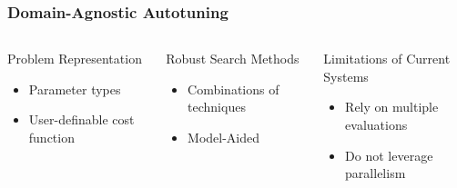 \documentclass[10pt, compress, aspectratio=169]{beamer}
\begin{document}
\begin{frame}
    \frametitle{Domain-Agnostic Autotuning}
    \begin{columns}[c]
        \begin{block}{Problem Representation}
            \begin{itemize}
                \item Parameter \alert{types}
                \item \alert{User-definable cost function}
            \end{itemize}
        \end{block}

        \begin{block}{Robust Search Methods}
            \begin{itemize}
                \item \alert{Combinations} of techniques
                \item \alert{Model-Aided}
            \end{itemize}
        \end{block}

        \pause

        \begin{block}{Limitations of Current Systems}
            \begin{itemize}
                \item Rely on \alert{multiple evaluations}
                \item \alert{Do not leverage parallelism}
            \end{itemize}
        \end{block}

    \end{columns}
\end{frame}
\end{document}
